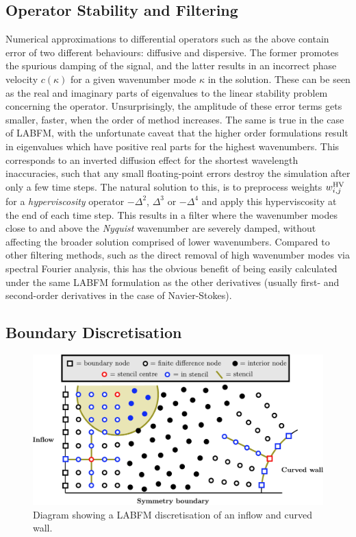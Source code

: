 \subsection{Operator Stability and Filtering}

Numerical approximations to differential operators such as the above contain error of two different behaviours: diffusive and dispersive. The former promotes the spurious damping of the signal, and the latter results in an incorrect phase velocity $c(κ)$ for a given wavenumber mode $κ$ in the solution. These can be seen as the real and imaginary parts of eigenvalues to the linear stability problem concerning the operator. Unsurprisingly, the amplitude of these error terms gets smaller, faster, when the order of method increases. The same is true in the case of LABFM, with the unfortunate caveat that the higher order formulations result in eigenvalues which have positive real parts for the highest wavenumbers. This corresponds to an inverted diffusion effect for the shortest wavelength inaccuracies, such that any small floating-point errors destroy the simulation after only a few time steps. The natural solution to this, is to preprocess weights $w^{\rm{HV}}_{i, j}$ for a \emph{hyperviscosity} operator $-Δ^2$, $Δ^3$ or $-Δ^4$ and apply this hyperviscosity at the end of each time step. This results in a filter where the wavenumber modes close to and above the \emph{Nyquist} wavenumber \cite{nyquist1928CertainTopicsTelegraph} are severely damped, without affecting the broader solution comprised of lower wavenumbers. Compared to other filtering methods, such as the direct removal of high wavenumber modes via spectral Fourier analysis, this has the obvious benefit of being easily calculated under the same LABFM formulation as the other derivatives (usually first- and second-order derivatives in the case of Navier-Stokes).


\subsection{Boundary Discretisation}

\begin{figure}[t]
\centering
\includegraphics[scale=0.65]{assets/imgs/LABFM-boundary-stencils.pdf}
\vspace*{0.5em}
\caption{Diagram showing a LABFM discretisation of an inflow and curved wall.}
\label{fig:labfm-boundary}
\end{figure}

